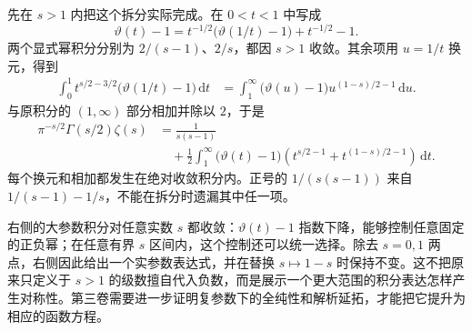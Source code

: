 先在 \(s>1\) 内把这个拆分实际完成。在 \(0<t<1\) 中写成
\[
 \vartheta(t)-1
 =t^{-1/2}\bigl(\vartheta(1/t)-1\bigr)+t^{-1/2}-1.
\]
两个显式幂积分分别为 \(2/(s-1)\)、\(2/s\)，都因 \(s>1\) 收敛。其余项用 \(u=1/t\) 换元，得到
\[
 \begin{aligned}
 \int_0^1t^{s/2-3/2}\bigl(\vartheta(1/t)-1\bigr)\,\mathrm{d}t
 &=\int_1^\infty\bigl(\vartheta(u)-1\bigr)u^{(1-s)/2-1}\,\mathrm{d}u.
 \end{aligned}
\]
与原积分的 \((1,\infty)\) 部分相加并除以 \(2\)，于是
\begin{equation}\label{b2:eq:06-mellin-split}
 \begin{aligned}
 \pi^{-s/2}\Gamma(s/2)\zeta(s)
 &=\frac1{s(s-1)}\\
 &\quad+\frac12\int_1^\infty\bigl(\vartheta(t)-1\bigr)
       \left(t^{s/2-1}+t^{(1-s)/2-1}\right)\,\mathrm{d}t.
 \end{aligned}
\end{equation}
每个换元和相加都发生在绝对收敛积分内。正号的 \(1/(s(s-1))\) 来自 \(1/(s-1)-1/s\)，不能在拆分时遗漏其中任一项。

\ProseParagraphBreak

右侧的大参数积分对任意实数 \(s\) 都收敛：\(\vartheta(t)-1\) 指数下降，能够控制任意固定的正负幂；在任意有界 \(s\) 区间内，这个控制还可以统一选择。除去 \(s=0,1\) 两点，右侧因此给出一个实参数表达式，并在替换 \(s\mapsto1-s\) 时保持不变。这不把原来只定义于 \(s>1\) 的级数擅自代入负数，而是展示一个更大范围的积分表达怎样产生对称性。第三卷需要进一步证明复参数下的全纯性和解析延拓，才能把它提升为相应的函数方程。
